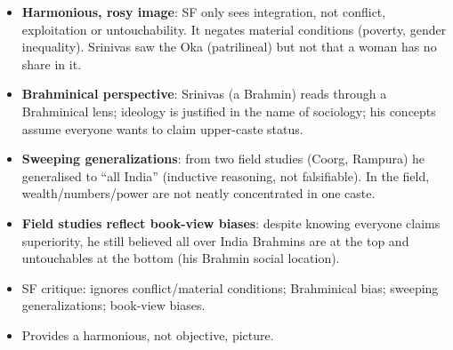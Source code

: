 \begin{itemize}
\item \textbf{Harmonious, rosy image}: SF only sees integration, not conflict, exploitation or untouchability. It negates material conditions (poverty, gender inequality). Srinivas saw the Oka (patrilineal) but not that a woman has no share in it.
\item \textbf{Brahminical perspective}: Srinivas (a Brahmin) reads through a Brahminical lens; ideology is justified in the name of sociology; his concepts assume everyone wants to claim upper-caste status.
\item \textbf{Sweeping generalizations}: from two field studies (Coorg, Rampura) he generalised to ``all India'' (inductive reasoning, not falsifiable). In the field, wealth/numbers/power are not neatly concentrated in one caste.
\item \textbf{Field studies reflect book-view biases}: despite knowing everyone claims superiority, he still believed all over India Brahmins are at the top and untouchables at the bottom (his Brahmin social location).
\end{itemize}

\begin{QuickRevision}
\begin{itemize}
\item SF critique: ignores conflict/material conditions; Brahminical bias; sweeping generalizations; book-view biases.
\item Provides a harmonious, not objective, picture.
\end{itemize}
\end{QuickRevision}
